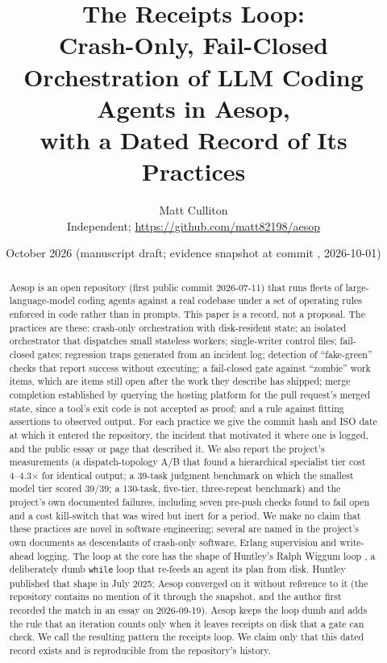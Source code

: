 \documentclass[11pt]{article}
\title{The Receipts Loop:\\Crash-Only, Fail-Closed Orchestration of LLM Coding Agents in Aesop,\\with a Dated Record of Its Practices}
\author{Matt Culliton\\\small Independent; \url{https://github.com/matt82198/aesop}}
\date{October 2026 \quad (manuscript draft; evidence snapshot at commit \sha{d8135aba}, 2026-10-01)}
\begin{document}
\maketitle

\begin{abstract}
Aesop is an open repository (first public commit 2026-07-11) that runs fleets of large-language-model coding agents against a real codebase under a set of operating rules enforced in code rather than in prompts. This paper is a record, not a proposal. The practices are these: crash-only orchestration with disk-resident state; an isolated orchestrator that dispatches small stateless workers; single-writer control files; fail-closed gates; regression traps generated from an incident log; detection of ``fake-green'' checks that report success without executing; a fail-closed gate against ``zombie'' work items, which are items still open after the work they describe has shipped; merge completion established by querying the hosting platform for the pull request's merged state, since a tool's exit code is not accepted as proof; and a rule against fitting assertions to observed output. For each practice we give the commit hash and ISO date at which it entered the repository, the incident that motivated it where one is logged, and the public essay or page that described it. We also report the project's measurements (a dispatch-topology A/B that found a hierarchical specialist tier cost 4--4.3$\times$ for identical output; a 39-task judgment benchmark on which the smallest model tier scored 39/39; a 130-task, five-tier, three-repeat benchmark) and the project's own documented failures, including seven pre-push checks found to fail open and a cost kill-switch that was wired but inert for a period. We make no claim that these practices are novel in software engineering; several are named in the project's own documents as descendants of crash-only software, Erlang supervision and write-ahead logging. The loop at the core has the shape of Huntley's Ralph Wiggum loop \cite{huntley2025}, a deliberately dumb \texttt{while} loop that re-feeds an agent its plan from disk. Huntley published that shape in July 2025; Aesop converged on it without reference to it (the repository contains no mention of it through the snapshot, and the author first recorded the match in an essay on 2026-09-19). Aesop keeps the loop dumb and adds the rule that an iteration counts only when it leaves receipts on disk that a gate can check. We call the resulting pattern the receipts loop. We claim only that this dated record exists and is reproducible from the repository's history.
\end{abstract}
\end{document}
